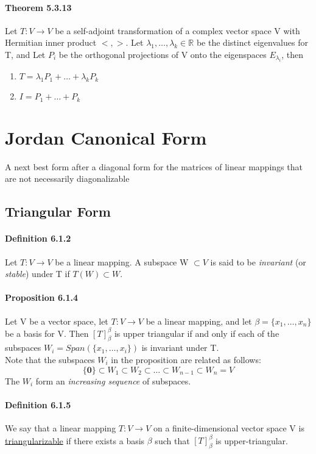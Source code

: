 \documentclass[11pt]{article}
\newcommand{\ti}[1]{\textit{#1}}
\newcommand{\tb}[1]{\textbf{#1}}
\newcommand{\under}[1]{\underline{#1}}
\newcommand{\real}[0]{\mathbb{R}}
\newcommand{\vo}[0]{\tb{0}}
\begin{document}
{\paragraph{Theorem 5.3.13} Let $T: V \rightarrow V$ be a self-adjoint transformation of a complex vector space V with Hermitian inner product $<,>$. Let $\lambda_1,\hdots,\lambda_k \in \real$ be the distinct eigenvalues for T, and Let $P_i$ be the orthogonal projections of V onto the eigenspaces $E	_{\lambda_i}$, then
\begin{enumerate}
	\item $T = \lambda_1P_1 + \hdots +\lambda_kP_k$
	\item $I = P_1 + \hdots + P_k$
\end{enumerate}
\section{Jordan Canonical Form}
A next best form after a diagonal form for the matrices of linear mappings that are not necessarily diagonalizable
\subsection{Triangular Form}
\paragraph{Definition 6.1.2} Let $T: V\rightarrow V$ be a linear mapping. A subspace W $\subset V$ is said to be \ti{invariant} (or \ti{stable}) under T if $T(W) \subset W$.
\paragraph{Proposition 6.1.4}
Let V be a vector space, let $T: V \rightarrow V$ be a linear mapping, and let $\beta = \{x_1, \hdots, x_n\}$ be a basis for V. Then $[T]_\beta^\beta$ is upper triangular if and only if each of the subspaces $W_i = Span(\{x_1,\hdots,x_i\})$ is invariant under T.\\
Note that the subspaces $W_i$ in the proposition are related as follows:
$$\{\vo\} \subset W_1 \subset W_2 \subset \hdots \subset W_{n-1} \subset W_n = V$$
The $W_i$ form an \ti{increasing sequence} of subspaces.
\paragraph{Definition 6.1.5} We say that a linear mapping $T: V \rightarrow V$ on a finite-dimensional vector space V is \under{triangularizable} if there exists a basis $\beta$ such that $[T]_\beta^\beta$ is upper-triangular.
}
\end{document}
